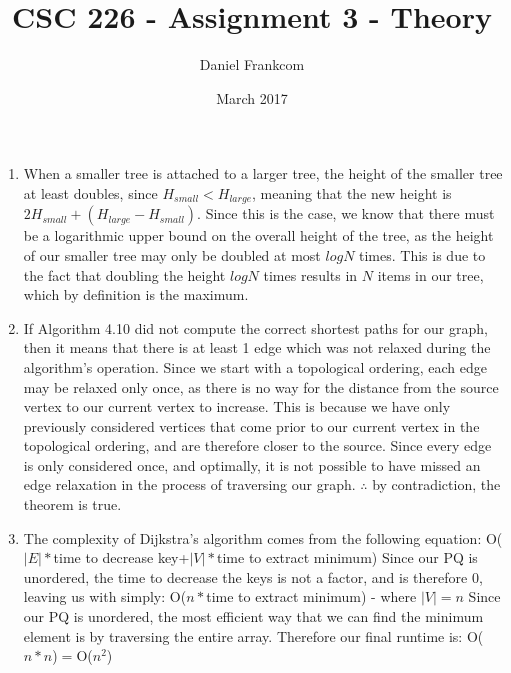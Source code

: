 \documentclass{article}
\title{CSC 226 - Assignment 3 - Theory}
\date{March 2017}
\author{Daniel Frankcom}
\begin{document}
	\maketitle
	\setlength{\parindent}{0pt}
	\newcommand{\forceindent}{\leavevmode{\parindent=72pt\indent}}
	\newpage
	
	\begin{enumerate}
		\item When a smaller tree is attached to a larger tree, the height of the smaller tree at least doubles, since $H_{small}<H_{large}$, meaning that the new height is $2H_{small}+(H_{large}-H_{small})$.
		\newline Since this is the case, we know that there must be a logarithmic upper bound on the overall height of the tree, as the height of our smaller tree may only be doubled at most $logN$ times. This is due to the fact that doubling the height $logN$ times results in $N$ items in our tree, which by definition is the maximum.
		
		\item If Algorithm 4.10 did not compute the correct shortest paths for our graph, then it means that there is at least 1 edge which was not relaxed during the algorithm's operation.
		\newline Since we start with a topological ordering, each edge may be relaxed only once, as there is no way for the distance from the source vertex to our current vertex to increase. This is because we have only previously considered vertices that come prior to our current vertex in the topological ordering, and are therefore closer to the source.
		\newline Since every edge is only considered once, and optimally, it is not possible to have missed an edge relaxation in the process of traversing our graph.
		\newline $\therefore$ by contradiction, the theorem is true.
		
		\item The complexity of Dijkstra's algorithm comes from the following equation:
		\newline O($|E|*$time to decrease key+$|V|*$time to extract minimum)
		\newline Since our PQ is unordered, the time to decrease the keys is not a factor, and is therefore 0, leaving us with simply:
		\newline O($n*$time to extract minimum) - where $|V|=n$
		\newline Since our PQ is unordered, the most efficient way that we can find the minimum element is by traversing the entire array. Therefore our final runtime is:
		\newline O($n*n$)$=$O($n^2$)
	\end{enumerate}
\end{document}
